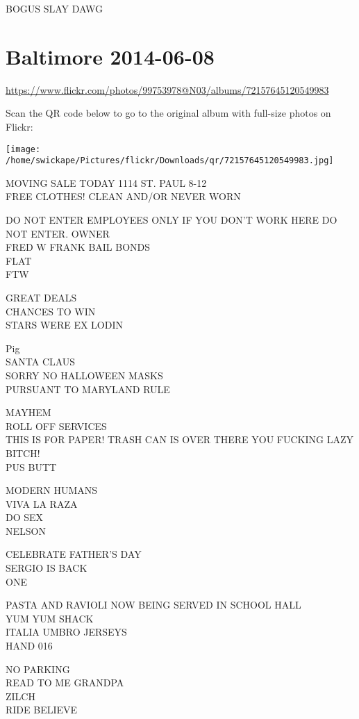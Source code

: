 \documentclass[10pt,letterpaper]{article}
\begin{document}
BOGUS SLAY DAWG
\pagebreak

\section*{Baltimore 2014-06-08}

\url{https://www.flickr.com/photos/99753978@N03/albums/72157645120549983}

Scan the QR code below to go to the original album with full-size photos on Flickr:

\texttt{[image: /home/swickape/Pictures/flickr/Downloads/qr/72157645120549983.jpg]}
\pagebreak

MOVING SALE TODAY 1114 ST. PAUL 8{-}12\\
FREE CLOTHES! CLEAN AND/OR NEVER WORN

DO NOT ENTER EMPLOYEES ONLY IF YOU DON'T WORK HERE DO NOT ENTER.  OWNER\\
FRED W FRANK BAIL BONDS\\
FLAT\\
FTW

GREAT DEALS\\
CHANCES TO WIN\\
STARS WERE EX LODIN

Pig\\
SANTA CLAUS\\
SORRY NO HALLOWEEN MASKS\\
PURSUANT TO MARYLAND RULE

MAYHEM\\
ROLL OFF SERVICES\\
THIS IS FOR PAPER!  TRASH CAN IS OVER THERE YOU FUCKING LAZY BITCH!\\
PUS BUTT

MODERN HUMANS\\
VIVA LA RAZA\\
DO SEX\\
NELSON

CELEBRATE FATHER'S DAY\\
SERGIO IS BACK\\
ONE

PASTA AND RAVIOLI NOW BEING SERVED IN SCHOOL HALL\\
YUM YUM SHACK\\
ITALIA UMBRO JERSEYS\\
HAND 016

NO PARKING\\
READ TO ME GRANDPA\\
ZILCH\\
RIDE BELIEVE
\end{document}
